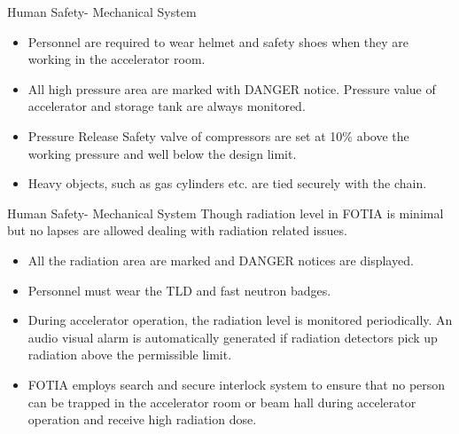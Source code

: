 \documentclass[11pt]{beamer}
\begin{document}
\begin{frame}{Human Safety- Mechanical System}




 \begin{itemize} 
 \item Personnel are required to wear helmet and safety shoes when they are working in the accelerator room.
\item All high pressure area are marked with DANGER notice. Pressure value of accelerator and storage tank are always monitored.
\item Pressure  Release Safety valve of compressors are set at 10\% above the working pressure and well below the design limit.
\item Heavy objects, such as gas cylinders etc. are tied securely with the chain. 
\end{itemize}		
	 
 
\end{frame}



\begin{frame}{Human Safety- Mechanical System}
Though radiation level in FOTIA is minimal but no lapses are allowed dealing with radiation related issues.
\begin{itemize} 
 \item All the radiation area are marked and DANGER notices are  displayed.
 \item Personnel must wear the TLD and fast neutron badges.
 \item During accelerator operation, the radiation level is monitored periodically. An audio visual alarm is automatically generated if radiation detectors pick up radiation above the permissible limit.
\item FOTIA employs search and secure interlock system to ensure that no person can be trapped in the accelerator room or beam hall during accelerator operation and receive high radiation dose. 
\end{itemize}		
	 
 
\end{frame}
\end{document}
